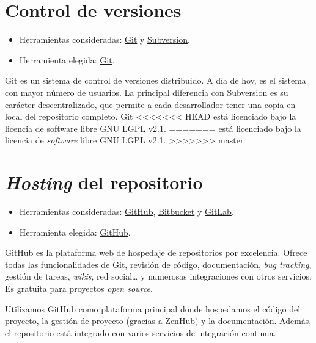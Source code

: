 
\section{Control de versiones}\label{control-de-versiones}

\begin{itemize}
\tightlist
\item
  Herramientas consideradas: \href{https://git-scm.com/}{Git} y
  \href{https://subversion.apache.org/}{Subversion}.
\item
  Herramienta elegida: \href{https://git-scm.com/}{Git}.
\end{itemize}

Git es un sistema de control de versiones distribuido. A día de hoy, es
el sistema con mayor número de usuarios. La principal diferencia con
Subversion es su carácter descentralizado, que permite a cada
desarrollador tener una copia en local del repositorio completo. Git
<<<<<<< HEAD
está licenciado bajo la licencia de software libre GNU LGPL v2.1.
=======
está licenciado bajo la licencia de \emph{software} libre GNU LGPL v2.1.
>>>>>>> master

\section{\emph{Hosting} del repositorio}\label{hosting-del-repositorio}

\begin{itemize}
\tightlist
\item
  Herramientas consideradas: \href{https://github.com/}{GitHub},
  \href{https://bitbucket.org/}{Bitbucket} y
  \href{https://gitlab.com/}{GitLab}.
\item
  Herramienta elegida: \href{https://github.com/}{GitHub}.
\end{itemize}

GitHub es la plataforma web de hospedaje de repositorios por excelencia.
Ofrece todas las funcionalidades de Git, revisión de código,
documentación, \emph{bug tracking}, gestión de tareas, \emph{wikis}, red
social\ldots{} y numerosas integraciones con otros servicios. Es
gratuita para proyectos \emph{open source}.

Utilizamos GitHub como plataforma principal donde hospedamos el código
del proyecto, la gestión de proyecto (gracias a ZenHub) y la
documentación. Además, el repositorio está integrado con varios
servicios de integración continua.


